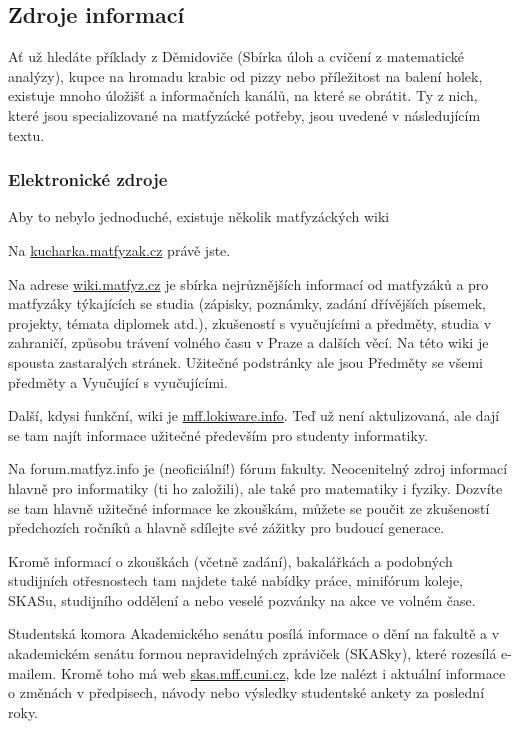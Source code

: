 \subsection{Zdroje informací}
Ať už hledáte příklady z Děmidoviče (Sbírka úloh a cvičení z matematické
analýzy), kupce na hromadu krabic od pizzy nebo příležitost na balení holek,
existuje mnoho úložišť a informačních kanálů, na které se obrátit. Ty z nich,
které jsou specializované na matfyzácké potřeby, jsou uvedené v následujícím
textu.


\subsubsection{Elektronické zdroje}
Aby to nebylo jednoduché, existuje několik matfyzáckých wiki

Na \url{kucharka.matfyzak.cz} právě jste.

Na adrese \url{wiki.matfyz.cz} je sbírka nejrůznějších informací od matfyzáků a
pro matfyzáky týkajících se studia (zápisky, poznámky, zadání dřívějších
písemek, projekty, témata diplomek atd.), zkušeností s vyučujícími a předměty,
studia v zahraničí, způsobu trávení volného času v Praze a dalších věcí. Na této
wiki je spousta zastaralých stránek. Užitečné podstránky ale jsou Předměty se
všemi předměty a Vyučující s vyučujícími.

Další, kdysi funkční, wiki je \url{mff.lokiware.info}. Teď už není aktulizovaná,
ale dají se tam najít informace užitečné především pro studenty informatiky.


Na forum.matfyz.info je (neoficiální!) fórum fakulty. Neocenitelný zdroj
informací hlavně pro informatiky (ti ho založili), ale také pro matematiky i
fyziky. Dozvíte se tam hlavně užitečné informace ke zkouškám, můžete se poučit
ze zkušeností předchozích ročníků a hlavně sdílejte své zážitky pro budoucí
generace.

Kromě informací o zkouškách (včetně zadání), bakalářkách a podobných studijních
otřesnostech tam najdete také nabídky práce, minifórum koleje, SKASu, studijního
oddělení a nebo veselé pozvánky na akce ve volném čase.


Studentská komora Akademického senátu posílá informace o dění na fakultě a v
akademickém senátu formou nepravidelných zpráviček (SKASky), které rozesílá
e-mailem. Kromě toho má web \url{skas.mff.cuni.cz}, kde lze nalézt i aktuální
informace o změnách v předpisech, návody nebo výsledky studentské ankety za
poslední roky.


